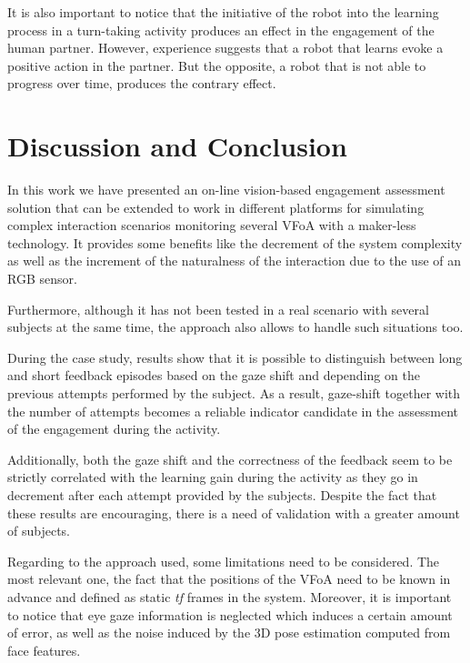 \documentclass{sig-alternate}
\begin{document}
It is also important to notice that the initiative of the robot into the
learning process in a turn-taking activity produces an effect in the engagement
of the human partner. However, experience suggests that a robot that learns
evoke a positive action in the partner. But the opposite, a robot that is not
able to progress over time, produces the contrary effect.




\section{Discussion and Conclusion}

In this work we have presented an on-line vision-based engagement assessment
solution that can be extended to work in different platforms for simulating
complex interaction scenarios monitoring several VFoA with a maker-less
technology. It provides some benefits like the decrement of the system
complexity as well as the increment of the naturalness of the interaction due to
the use of an RGB sensor.  

Furthermore, although it has not been tested in a real scenario with several
subjects at the same time, the approach also allows to handle such situations
too.

During the case study, results show that it is possible to distinguish between
long and short feedback episodes based on the gaze shift and depending on the
previous attempts performed by the subject. As a result, gaze-shift together
with the number of attempts becomes a reliable indicator candidate in the
assessment of the engagement during the activity.

Additionally, both the gaze shift and the correctness of the feedback seem to be
strictly correlated with the learning gain during the activity as they go in
decrement after each attempt provided by the subjects. Despite the fact that
these results are encouraging, there is a need of validation with a greater
amount of subjects.

Regarding to the approach used, some limitations need to be considered. The most
relevant one, the fact that the positions of the VFoA need to be known in
advance and defined as static \textit{tf} frames in the system. Moreover, it is
important to notice that eye gaze information is neglected which induces a
certain amount of error, as well as the noise induced by the 3D pose estimation
computed from face features.
\end{document}
